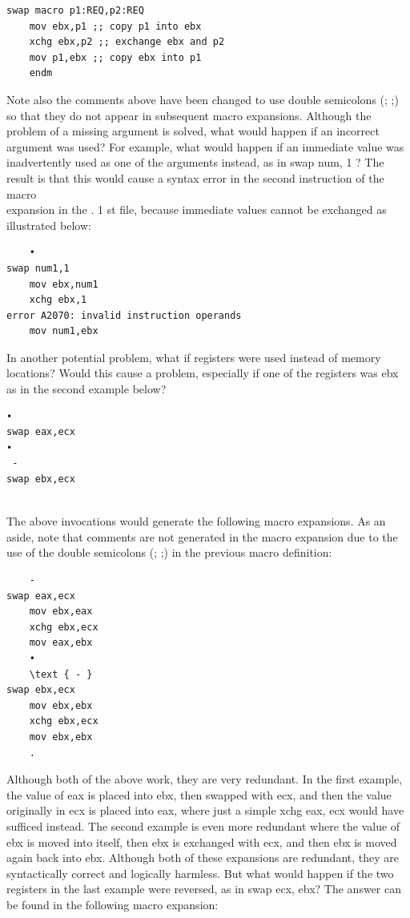 \documentclass[10pt]{article}
\begin{document}
\begin{verbatim}
swap macro p1:REQ,p2:REQ
    mov ebx,p1 ;; copy p1 into ebx
    xchg ebx,p2 ;; exchange ebx and p2
    mov p1,ebx ;; copy ebx into p1
    endm
\end{verbatim}

Note also the comments above have been changed to use double semicolons (; ;) so that they do not appear in subsequent macro expansions. Although the problem of a missing argument is solved, what would happen if an incorrect argument was used? For example, what would happen if an immediate value was inadvertently used as one of the arguments instead, as in swap num, 1 ? The result is that this would cause a syntax error in the second instruction of the macro\\
expansion in the . 1 st file, because immediate values cannot be exchanged as illustrated below:

\begin{verbatim}
    •
swap num1,1
    mov ebx,num1
    xchg ebx,1
error A2070: invalid instruction operands
    mov num1,ebx
\end{verbatim}

In another potential problem, what if registers were used instead of memory locations? Would this cause a problem, especially if one of the registers was ebx as in the second example below?

\begin{verbatim}
•
swap eax,ecx
•
 -
swap ebx,ecx
  
\end{verbatim}

The above invocations would generate the following macro expansions. As an aside, note that comments are not generated in the macro expansion due to the use of the double semicolons (; ;) in the previous macro definition:

\begin{verbatim}
    -
swap eax,ecx
    mov ebx,eax
    xchg ebx,ecx
    mov eax,ebx
    •
    \text { - }
swap ebx,ecx
    mov ebx,ebx
    xchg ebx,ecx
    mov ebx,ebx
    .
\end{verbatim}

Although both of the above work, they are very redundant. In the first example, the value of eax is placed into ebx, then swapped with ecx, and then the value originally in ecx is placed into eax, where just a simple xchg eax, ecx would have sufficed instead. The second example is even more redundant where the value of ebx is moved into itself, then ebx is exchanged with ecx, and then ebx is moved again back into ebx. Although both of these expansions are redundant, they are syntactically correct and logically harmless. But what would happen if the two registers in the last example were reversed, as in swap ecx, ebx? The answer can be found in the following macro expansion:
\end{document}
